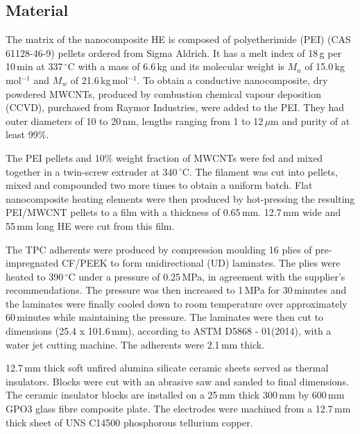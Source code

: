 \subsection{Material}

The matrix of the nanocomposite HE is composed of polyetherimide (PEI) (CAS 61128-46-9) pellets ordered from Sigma Aldrich. 
It has a melt index of 18\,g per 10\,min at 337\,$^{\circ}$C with a mass of 6.6\,kg and its molecular weight is $M_n$ of \mbox{15.0\,kg\,mol$^{-1}$} and $M_w$ of \mbox{21.6\,kg\,mol$^{-1}$}. 
To obtain a conductive nanocomposite, dry powdered \mbox{MWCNTs}, produced by combustion chemical vapour deposition (CCVD), purchased from Raymor Industries, were added to the PEI. 
They had outer diameters of 10 to 20\,nm, lengths ranging from 1 to \mbox{12\,$\mu$m} and purity of at least 99\%. 

The PEI pellets and 10\% weight fraction of MWCNTs were fed and mixed together in a twin-screw extruder at 340\,$^{\circ}$C. 
The filament was cut into pellets, mixed and compounded two more times to obtain a uniform batch. 
Flat nanocomposite heating elements were then produced by hot-pressing the resulting PEI/MWCNT pellets to a film with a thickness of \mbox{0.65\,mm}. 
\mbox{12.7\,mm} wide and \mbox{55\,mm} long HE were cut from this film. 

The TPC adherents were produced by compression moulding 16 plies of pre-impregnated CF/PEEK to form unidirectional (UD) laminates. 
The plies were heated to 390\,$^{\circ}$C under a pressure of 0.25\,MPa, in agreement with the supplier’s recommendations. 
The pressure was then increased to 1\,MPa for 30\,minutes and the laminates were finally cooled down to room temperature over approximately 60\,minutes while maintaining the pressure. 
The laminates were then cut to dimensions (25.4 x \mbox{101.6\,mm}), according to ASTM D5868 - 01(2014), with a water jet cutting machine. 
The adherents were \mbox{2.1\,mm} thick. 

\mbox{12.7\,mm} thick soft unfired alumina silicate ceramic sheets served as thermal insulators. 
Blocks were cut with an abrasive saw and sanded to final dimensions. 
The ceramic insulator blocks are installed on a \mbox{25\,mm} thick \mbox{300\,mm} by \mbox{600\,mm} GPO3 glass fibre composite plate. 
The electrodes were machined from a \mbox{12.7\,mm} thick sheet of UNS C14500 phosphorous tellurium copper. 

